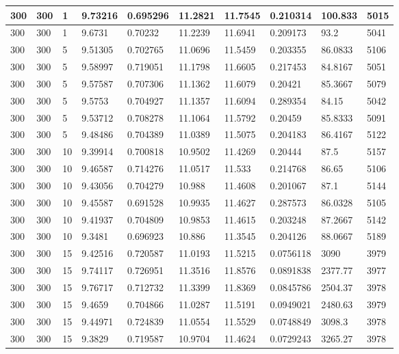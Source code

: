 \begin{landscape}
\begin{longtable}{ | l | l | l | l | l | l | l | l | l | l | }
300 & 300 & 1 & 9.73216 & 0.695296 & 11.2821 & 11.7545 & 0.210314 & 100.833 & 5015\\ \hline
300 & 300 & 1 & 9.6731 & 0.70232 & 11.2239 & 11.6941 & 0.209173 & 93.2 & 5041\\ \hline
300 & 300 & 5 & 9.51305 & 0.702765 & 11.0696 & 11.5459 & 0.203355 & 86.0833 & 5106\\ \hline
300 & 300 & 5 & 9.58997 & 0.719051 & 11.1798 & 11.6605 & 0.217453 & 84.8167 & 5051\\ \hline
300 & 300 & 5 & 9.57587 & 0.707306 & 11.1362 & 11.6079 & 0.20421 & 85.3667 & 5079\\ \hline
300 & 300 & 5 & 9.5753 & 0.704927 & 11.1357 & 11.6094 & 0.289354 & 84.15 & 5042\\ \hline
300 & 300 & 5 & 9.53712 & 0.708278 & 11.1064 & 11.5792 & 0.20459 & 85.8333 & 5091\\ \hline
300 & 300 & 5 & 9.48486 & 0.704389 & 11.0389 & 11.5075 & 0.204183 & 86.4167 & 5122\\ \hline
300 & 300 & 10 & 9.39914 & 0.700818 & 10.9502 & 11.4269 & 0.20444 & 87.5 & 5157\\ \hline
300 & 300 & 10 & 9.46587 & 0.714276 & 11.0517 & 11.533 & 0.214768 & 86.65 & 5106\\ \hline
300 & 300 & 10 & 9.43056 & 0.704279 & 10.988 & 11.4608 & 0.201067 & 87.1 & 5144\\ \hline
300 & 300 & 10 & 9.45587 & 0.691528 & 10.9935 & 11.4627 & 0.287573 & 86.0328 & 5105\\ \hline
300 & 300 & 10 & 9.41937 & 0.704809 & 10.9853 & 11.4615 & 0.203248 & 87.2667 & 5142\\ \hline
300 & 300 & 10 & 9.3481 & 0.696923 & 10.886 & 11.3545 & 0.204126 & 88.0667 & 5189\\ \hline
300 & 300 & 15 & 9.42516 & 0.720587 & 11.0193 & 11.5215 & 0.0756118 & 3090 & 3979\\ \hline
300 & 300 & 15 & 9.74117 & 0.726951 & 11.3516 & 11.8576 & 0.0891838 & 2377.77 & 3977\\ \hline
300 & 300 & 15 & 9.76717 & 0.712732 & 11.3399 & 11.8369 & 0.0845786 & 2504.37 & 3978\\ \hline
300 & 300 & 15 & 9.4659 & 0.704866 & 11.0287 & 11.5191 & 0.0949021 & 2480.63 & 3979\\ \hline
300 & 300 & 15 & 9.44971 & 0.724839 & 11.0554 & 11.5529 & 0.0748849 & 3098.3 & 3978\\ \hline
300 & 300 & 15 & 9.3829 & 0.719587 & 10.9704 & 11.4624 & 0.0729243 & 3265.27 & 3978\\ \hline

\end{longtable}
\end{landscape}
